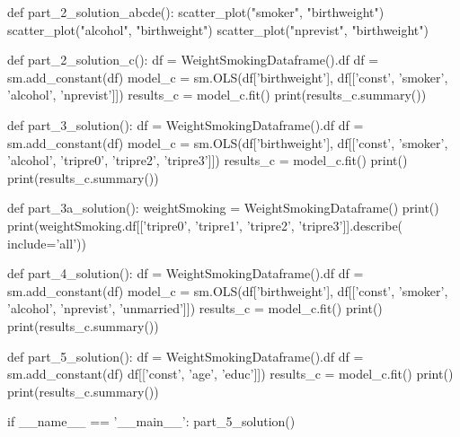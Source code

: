 \documentclass{uofa-eng-assignment}
\begin{document}
\begin{python}
    
    def part_2_solution_abcde():
        scatter_plot("smoker", "birthweight")
        scatter_plot("alcohol", "birthweight")
        scatter_plot("nprevist", "birthweight")
    
    
    def part_2_solution_c():
        df = WeightSmokingDataframe().df
        df = sm.add_constant(df)
        model_c = sm.OLS(df['birthweight'],
                         df[['const', 'smoker', 'alcohol', 'nprevist']])
        results_c = model_c.fit()
        print(results_c.summary())
    
    
    def part_3_solution():
        df = WeightSmokingDataframe().df
        df = sm.add_constant(df)
        model_c = sm.OLS(df['birthweight'],
                         df[['const', 'smoker', 'alcohol', 'tripre0', 'tripre2', 'tripre3']])
        results_c = model_c.fit()
        print()
        print(results_c.summary())
    
    
    def part_3a_solution():
        weightSmoking = WeightSmokingDataframe()
        print()
        print(weightSmoking.df[['tripre0', 'tripre1', 'tripre2', 'tripre3']].describe(
            include='all'))
    
    
    def part_4_solution():
        df = WeightSmokingDataframe().df
        df = sm.add_constant(df)
        model_c = sm.OLS(df['birthweight'],
                         df[['const', 'smoker', 'alcohol', 'nprevist', 'unmarried']])
        results_c = model_c.fit()
        print()
        print(results_c.summary())
    
    
    def part_5_solution():
        df = WeightSmokingDataframe().df
        df = sm.add_constant(df)
                         df[['const', 'age', 'educ']])
        results_c = model_c.fit()
        print()
        print(results_c.summary())
    
    
    if __name__ == '__main__':
        part_5_solution()
    
    \end{python}
\end{document}
